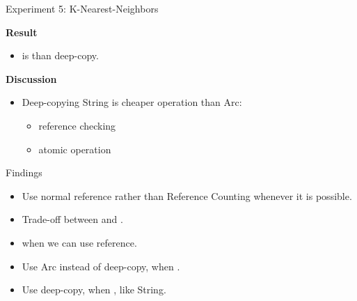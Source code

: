 \documentclass[9pt]{beamer}
\begin{document}
\begin{frame}[fragile]{Experiment 5: K-Nearest-Neighbors}
    
    \textbf{Result}
    \begin{itemize}
        \item {} is  than deep-copy.
    \end{itemize}

    \vspace{0.5cm}

    \textbf{Discussion}
    \begin{itemize}
        \item Deep-copying String is cheaper operation than Arc: 
        \begin{itemize}
            \item reference checking
            \item atomic operation
        \end{itemize}
    \end{itemize} 
\end{frame}



\begin{frame}[fragile]{Findings}
    \begin{itemize}
        \item Use normal reference rather than Reference Counting whenever it is possible.
        \item Trade-off between  and .
        \item {} when we can use reference.
        \item Use Arc instead of deep-copy, when .
        \item Use deep-copy, when , like String.
    \end{itemize}
\end{frame}

\end{document}
